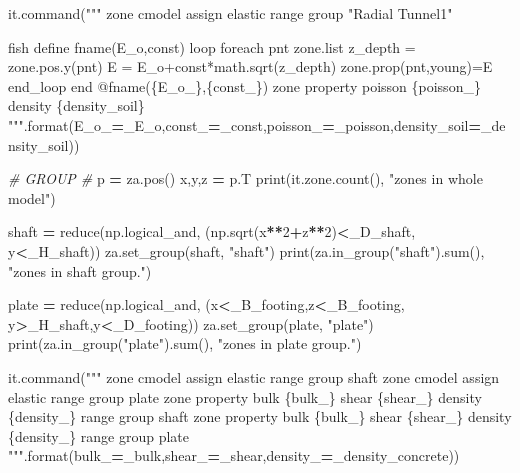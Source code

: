 \documentclass[a4paper, nobind]{templates/ociamthesis}
\newenvironment{Shaded}{\begin{snugshade}}{\end{snugshade}}
\newcommand{\BuiltInTok}[1]{#1}
\newcommand{\CommentTok}[1]{\textcolor[rgb]{0.56,0.35,0.01}{\textit{#1}}}
\newcommand{\DecValTok}[1]{\textcolor[rgb]{0.00,0.00,0.81}{#1}}
\newcommand{\NormalTok}[1]{#1}
\newcommand{\OperatorTok}[1]{\textcolor[rgb]{0.81,0.36,0.00}{\textbf{#1}}}
\newcommand{\SpecialCharTok}[1]{\textcolor[rgb]{0.00,0.00,0.00}{#1}}
\newcommand{\StringTok}[1]{\textcolor[rgb]{0.31,0.60,0.02}{#1}}
\renewenvironment{Shaded}
{
  \vspace{10pt}%
  \begin{snugshade}%
}{%
  \end{snugshade}%
  \vspace{8pt}%
}
\begin{document}
\begin{Shaded}
\begin{Highlighting}[]
\NormalTok{it.command(}\StringTok{"""}
\StringTok{zone cmodel assign elastic range group "Radial Tunnel1"}

\StringTok{fish define fname(E\_o,const)}
\StringTok{loop foreach pnt zone.list}
\StringTok{z\_depth = zone.pos.y(pnt)}
\StringTok{E = E\_o+const*math.sqrt(z\_depth)}
\StringTok{zone.prop(pnt,\textquotesingle{}young\textquotesingle{})=E}
\StringTok{end\_loop}
\StringTok{end}
\StringTok{@fname(}\SpecialCharTok{\{E\_o\_\}}\StringTok{,}\SpecialCharTok{\{const\_\}}\StringTok{)}
\StringTok{zone property poisson }\SpecialCharTok{\{poisson\_\}}\StringTok{ density }\SpecialCharTok{\{density\_soil\}}
\StringTok{"""}\NormalTok{.}\BuiltInTok{format}\NormalTok{(E\_o\_}\OperatorTok{=}\NormalTok{\_E\_o,const\_}\OperatorTok{=}\NormalTok{\_const,poisson\_}\OperatorTok{=}\NormalTok{\_poisson,density\_soil}\OperatorTok{=}\NormalTok{\_density\_soil))}


\CommentTok{\# GROUP \#}
\NormalTok{p }\OperatorTok{=}\NormalTok{ za.pos()}
\NormalTok{x,y,z }\OperatorTok{=}\NormalTok{ p.T}
\BuiltInTok{print}\NormalTok{(it.zone.count(), }\StringTok{"zones in whole model"}\NormalTok{)}

\NormalTok{shaft }\OperatorTok{=} \BuiltInTok{reduce}\NormalTok{(np.logical\_and, (np.sqrt(x}\OperatorTok{**}\DecValTok{2}\OperatorTok{+}\NormalTok{z}\OperatorTok{**}\DecValTok{2}\NormalTok{)}\OperatorTok{\textless{}}\NormalTok{\_D\_shaft, y}\OperatorTok{\textless{}}\NormalTok{\_H\_shaft))}
\NormalTok{za.set\_group(shaft, }\StringTok{"shaft"}\NormalTok{)}
\BuiltInTok{print}\NormalTok{(za.in\_group(}\StringTok{"shaft"}\NormalTok{).}\BuiltInTok{sum}\NormalTok{(), }\StringTok{"zones in shaft group."}\NormalTok{)}

\NormalTok{plate }\OperatorTok{=} \BuiltInTok{reduce}\NormalTok{(np.logical\_and, (x}\OperatorTok{\textless{}}\NormalTok{\_B\_footing,z}\OperatorTok{\textless{}}\NormalTok{\_B\_footing, y}\OperatorTok{\textgreater{}}\NormalTok{\_H\_shaft,y}\OperatorTok{\textless{}}\NormalTok{\_D\_footing))}
\NormalTok{za.set\_group(plate, }\StringTok{"plate"}\NormalTok{)}
\BuiltInTok{print}\NormalTok{(za.in\_group(}\StringTok{"plate"}\NormalTok{).}\BuiltInTok{sum}\NormalTok{(), }\StringTok{"zones in plate group."}\NormalTok{)}

\NormalTok{it.command(}\StringTok{"""}
\StringTok{zone cmodel assign elastic range group \textquotesingle{}shaft\textquotesingle{}}
\StringTok{zone cmodel assign elastic range group \textquotesingle{}plate\textquotesingle{}}
\StringTok{zone property bulk }\SpecialCharTok{\{bulk\_\}}\StringTok{ shear }\SpecialCharTok{\{shear\_\}}\StringTok{ density }\SpecialCharTok{\{density\_\}}\StringTok{ range group \textquotesingle{}shaft\textquotesingle{}}
\StringTok{zone property bulk }\SpecialCharTok{\{bulk\_\}}\StringTok{ shear }\SpecialCharTok{\{shear\_\}}\StringTok{ density }\SpecialCharTok{\{density\_\}}\StringTok{ range group \textquotesingle{}plate\textquotesingle{}}
\StringTok{"""}\NormalTok{.}\BuiltInTok{format}\NormalTok{(bulk\_}\OperatorTok{=}\NormalTok{\_bulk,shear\_}\OperatorTok{=}\NormalTok{\_shear,density\_}\OperatorTok{=}\NormalTok{\_density\_concrete))}


\end{Highlighting}
\end{Shaded}
\end{document}
